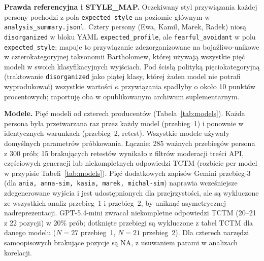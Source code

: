 \documentclass[11pt,a4paper]{article}
\begin{document}
\textbf{Prawda referencyjna i STYLE\_MAP.} Oczekiwany styl przywiązania każdej persony pochodzi z pola \texttt{expected\_style} na poziomie głównym w \texttt{analysis\_summary.jsonl}. Cztery persony (Ewa, Kamil, Marek, Radek) niosą \texttt{disorganized} w bloku YAML \texttt{expected\_profile}, ale \texttt{fearful\_avoidant} w polu \texttt{expected\_style}; mapuje to przywiązanie zdezorganizowane na bojaźliwo-unikowe w czterokategoryjnej taksonomii Bartholomew, której używają wszystkie pięć modeli w swoich klasyfikacyjnych wyjściach. Pod ścisłą polityką pięciokategoryjną (traktowanie \texttt{disorganized} jako piątej klasy, której żaden model nie potrafi wyprodukować) wszystkie wartości $\kappa$ przywiązania spadłyby o około 10 punktów procentowych; raportuję oba w opublikowanym archiwum suplementarnym.

\textbf{Modele.} Pięć modeli od czterech producentów (Tabela~\ref{tab:models}). Każda persona była przetwarzana raz przez każdy model (przebieg~1) i ponownie w identycznych warunkach (przebieg~2, retest). Wszystkie modele używały domyślnych parametrów próbkowania. Łącznie: 285 ważnych przebiegów persona z 300 prób; 15 brakujących retestów wynikało z filtrów moderacji treści API, częściowych generacji lub niekompletnych odpowiedzi TCTM (rozbicie per model w przypisie Tabeli~\ref{tab:models}). Pięć dodatkowych zapisów Gemini przebieg-3 (dla \texttt{ania, anna-sim, kasia, marek, michal-sim}) naprawia wcześniejsze zdegenerowane wyjścia i jest udostępnionych dla przejrzystości, ale są wykluczone ze wszystkich analiz przebieg~1 i przebieg~2, by uniknąć asymetrycznej nadreprezentacji. GPT-5.4-mini zwracał niekompletne odpowiedzi TCTM (20--21 z 22 pozycji) w 20\% prób; dotknięte przebiegi są wykluczone z tabel TCTM dla danego modelu ($N = 27$ przebieg~1, $N = 21$ przebieg~2). Dla czterech narzędzi samoopisowych brakujące pozycje są NA, z usuwaniem parami w analizach korelacji.
\end{document}
